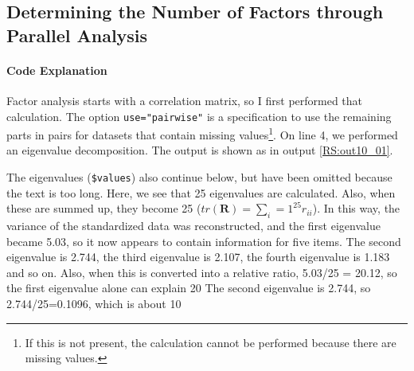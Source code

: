 \documentclass{ltjsbook}
\begin{document}
\subsection{Determining the Number of Factors through Parallel Analysis}

\paragraph{Code Explanation}


Factor analysis starts with a correlation matrix, so I first performed that calculation. The option \texttt{use="pairwise"} is a specification to use the remaining parts in pairs for datasets that contain missing values\footnote{If this is not present, the calculation cannot be performed because there are missing values.}. On line 4, we performed an eigenvalue decomposition. The output is shown as in output \ref{RS:out10_01}.



The eigenvalues (\verb|$values|) also continue below, but have been omitted because the text is too long. Here, we see that 25 eigenvalues are calculated. Also, when these are summed up, they become 25 ($tr(\bm{R})=\sum_i=1^{25} r_{ii}$). In this way, the variance of the standardized data was reconstructed, and the first eigenvalue became 5.03, so it now appears to contain information for five items. The second eigenvalue is 2.744, the third eigenvalue is 2.107, the fourth eigenvalue is 1.183 and so on. Also, when this is converted into a relative ratio, 5.03/25 = 20.12, so the first eigenvalue alone can explain 20%
The second eigenvalue is 2.744, so 2.744/25=0.1096, which is about 10%
\end{document}
